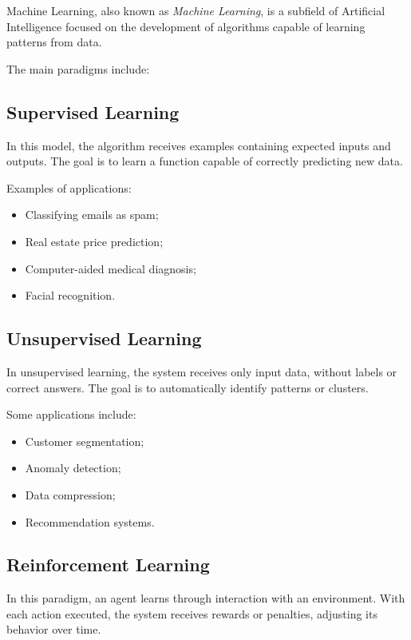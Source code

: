 \documentclass[11pt]{article}
\begin{document}
Machine Learning, also known as \textit{Machine Learning}, is a subfield of
Artificial Intelligence focused on the development of algorithms capable of learning patterns from
data.

The main paradigms include: 

\subsection{Supervised Learning}

In this model, the algorithm receives examples containing expected inputs and outputs. The goal is
to learn a function capable of correctly predicting new data.

Examples of applications:

\begin{itemize}
    \item Classifying emails as spam;
    \item Real estate price prediction;
    \item Computer-aided medical diagnosis;
    \item Facial recognition.
\end{itemize}
 

\subsection{Unsupervised Learning}

In unsupervised learning, the system receives only input data, without labels
or correct answers. The goal is to automatically identify patterns or clusters.

Some applications include:

\begin{itemize}
    \item Customer segmentation;
    \item Anomaly detection;
    \item Data compression;
    \item Recommendation systems.
\end{itemize} 

\subsection{Reinforcement Learning}

In this paradigm, an agent learns through interaction with an environment. With each action
executed, the system receives rewards or penalties, adjusting its behavior over
time.
\end{document}

